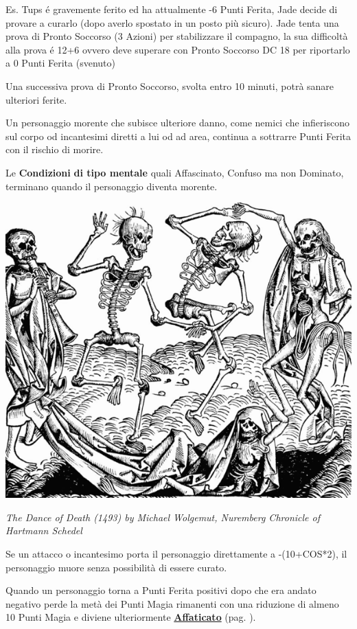 \begin{multicols}{2}
\begin{giocatore}
Es. Tups é gravemente ferito ed ha attualmente -6 Punti Ferita, Jade decide di provare a curarlo (dopo averlo spostato in un posto più sicuro). Jade tenta una prova di Pronto Soccorso (3 Azioni) per stabilizzare il compagno, la sua difficoltà alla prova é 12+6 ovvero deve superare con Pronto Soccorso DC 18 per riportarlo a 0 Punti Ferita (svenuto)

Una successiva prova di Pronto Soccorso, svolta entro 10 minuti, potrà sanare ulteriori ferite.
\end{giocatore}

Un personaggio morente che subisce ulteriore danno, come nemici che infieriscono sul corpo od incantesimi diretti a lui od ad area, continua a sottrarre Punti Ferita con il rischio di morire.

Le \textbf{Condizioni} \textbf{di tipo mentale} quali Affascinato, Confuso ma non Dominato, terminano quando il personaggio diventa morente.

\begin{center}
	\includegraphics[width=0.8\linewidth]{immagini/Nuremberg_chronicles.png}

	\emph{The Dance of Death (1493) by Michael Wolgemut, Nuremberg Chronicle of Hartmann Schedel}
\end{center}

\medskip

Se un attacco o incantesimo porta il personaggio direttamente a -(10+COS*2), il personaggio muore senza possibilità di essere curato.

Quando un personaggio torna a Punti Ferita positivi dopo che era andato negativo perde la metà dei Punti Magia rimanenti con una riduzione di almeno 10 Punti Magia e diviene ulteriormente \hyperlink{affaticato}{\textbf{Affaticato}} (pag. \pageref{affaticato}).


\end{multicols}
